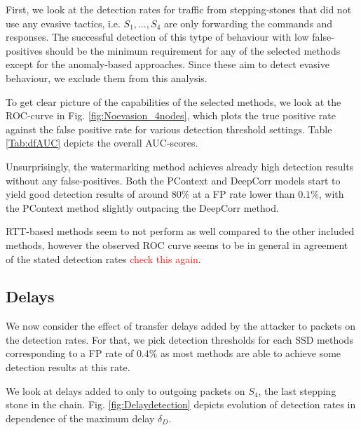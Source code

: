 \documentclass[runningheads]{llncs}\usepackage[]{graphicx}\usepackage[]{color}
\begin{document}
First, we look at the detection rates for traffic from stepping-stones that did not use any evasive tactics, i.e. $S_1,\dots,S_4$ are only forwarding the commands and responses. The successful detection of this tytpe of behaviour with low false-positives should be the minimum requirement for any of the selected methods except for the anomaly-based approaches. Since these aim to detect evasive behaviour, we exclude them from this analysis. 

To get clear picture of the capabilities of the selected methods, we look at the ROC-curve in Fig. \ref{fig:Noevasion_4nodes}, which plots the true positive rate against the false positive rate for various detection threshold settings. Table \ref{Tab:dfAUC} depicts the overall AUC-scores.



Unsurprisingly, the watermarking method achieves already high detection results without any false-positives. Both the PContext and DeepCorr models start to yield good detection results of around $80\%$ at a FP rate lower than $0.1\%$, with the PContext method slightly outpacing the DeepCorr method. 

RTT-based methods seem to not perform as well compared to the other included methods, however the observed ROC curve seems to be in general in agreement of the stated detection rates \textcolor{red}{check this again}.




\subsection{Delays}

We now consider the effect of transfer delays added by the attacker to packets on the detection rates. For that, we pick detection thresholds for each SSD methods corresponding to a FP rate of $0.4\%$ as most methods are able to achieve some detection results at this rate. 

We look at delays added to only to outgoing packets on $S_4$, the last stepping stone in the chain. Fig. \ref{fig:Delaydetection} depicts evolution of detection rates in dependence of the maximum delay $\delta_D$.


\end{document}
